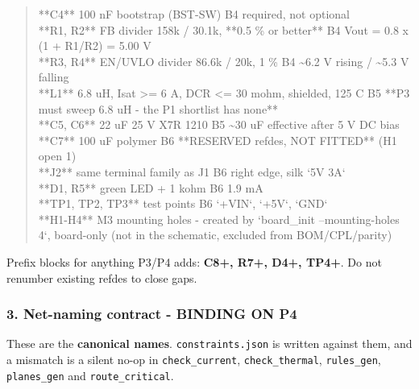 \documentclass[11pt,a4paper]{article}
\begin{document}
\begin{quote}
\textbar{} {*}{*}C4{*}{*} \textbar{} 100 nF bootstrap (BST-SW) \textbar{} B4 \textbar{} required, not optional \textbar{}\\
\textbar{} {*}{*}R1, R2{*}{*} \textbar{} FB divider 158k / 30.1k, {*}{*}0.5 \% or better{*}{*} \textbar{} B4 \textbar{} Vout = 0.8 x (1 + R1/R2) = 5.00 V \textbar{}\\
\textbar{} {*}{*}R3, R4{*}{*} \textbar{} EN/UVLO divider 86.6k / 20k, 1 \% \textbar{} B4 \textbar{} \textasciitilde{}6.2 V rising / \textasciitilde{}5.3 V falling \textbar{}\\
\textbar{} {*}{*}L1{*}{*} \textbar{} 6.8 uH, Isat \textgreater{}= 6 A, DCR \textless{}= 30 mohm, shielded, 125 C \textbar{} B5 \textbar{} {*}{*}P3 must sweep 6.8 uH - the P1 shortlist has none{*}{*} \textbar{}\\
\textbar{} {*}{*}C5, C6{*}{*} \textbar{} 22 uF 25 V X7R 1210 \textbar{} B5 \textbar{} \textasciitilde{}30 uF effective after 5 V DC bias \textbar{}\\
\textbar{} {*}{*}C7{*}{*} \textbar{} 100 uF polymer \textbar{} B6 \textbar{} {*}{*}RESERVED refdes, NOT FITTED{*}{*} (H1 open 1) \textbar{}\\
\textbar{} {*}{*}J2{*}{*} \textbar{} same terminal family as J1 \textbar{} B6 \textbar{} right edge, silk `5V 3A` \textbar{}\\
\textbar{} {*}{*}D1, R5{*}{*} \textbar{} green LED + 1 kohm \textbar{} B6 \textbar{} 1.9 mA \textbar{}\\
\textbar{} {*}{*}TP1, TP2, TP3{*}{*} \textbar{} test points \textbar{} B6 \textbar{} `+VIN`, `+5V`, `GND` \textbar{}\\
\textbar{} {*}{*}H1-H4{*}{*} \textbar{} M3 mounting holes \textbar{} - \textbar{} created by `board\_init --mounting-holes 4`, board-only (not in the schematic, excluded from BOM/CPL/parity) \textbar{}
\end{quote}
Prefix blocks for anything P3/P4 adds: \textbf{C8+, R7+, D4+, TP4+}. Do not renumber existing refdes to close gaps.

\subsubsection*{3. Net-naming contract - BINDING ON P4}
These are the \textbf{canonical names}. \texttt{constraints.json} is written against them, and a mismatch is a silent no-op in \texttt{check\_current}, \texttt{check\_thermal}, \texttt{rules\_gen}, \texttt{planes\_gen} and \texttt{route\_critical}.
\end{document}
